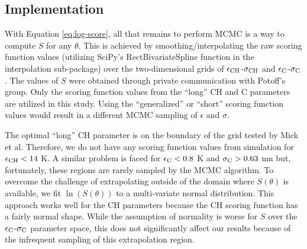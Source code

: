 \documentclass[preprint,review,11pt]{elsarticle}
\begin{document}
    \subsection{Implementation}

    With Equation \ref{eq:log-score}, all that remains to perform MCMC is a way to compute $S$ for any $\theta$. This is achieved by smoothing/interpolating the raw scoring function values (utilizing SciPy's RectBivariateSpline function in the interpolation sub-package) over the two-dimensional grids of $\epsilon_{\rm CH}$-$\sigma_{\rm CH}$ and $\epsilon_{\rm C}$-$\sigma_{\rm C}$. The values of $S$ were obtained through private communication with Potoff's group. Only the scoring function values from the ``long'' CH and C parameters are utilized in this study. Using the ``generalized'' or ``short'' scoring function values would result in a different MCMC sampling of $\epsilon$ and $\sigma$.
	
	The optimal ``long'' CH parameter is on the boundary of the grid tested by Mick et al. Therefore, we do not have any scoring function values from simulation for $\epsilon_{\rm CH} < 14$ K. A similar problem is faced for $\epsilon_{\rm C} < 0.8$ K and $\sigma_{\rm C} > 0.63$ nm but, fortunately, these regions are rarely sampled by the MCMC algorithm. To overcome the challenge of extrapolating outside of the domain where $S(\theta)$ is available, we fit $\ln(S(\theta))$ to a multi-variate normal distribution. This approach works well for the CH parameters because the CH scoring function has a fairly normal shape. While the assumption of normality is worse for $S$ over the $\epsilon_{\rm C}$-$\sigma_{\rm C}$ parameter space, this does not significantly affect our results because of the infrequent sampling of this extrapolation region.   



%	
%    
 
\end{document}
